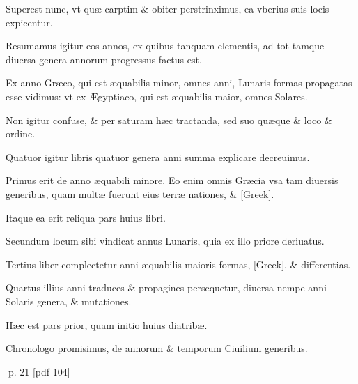 \begin{parnumbers}
Superest nunc, vt quæ carptim \& obiter perstrinximus, ea vberius suis locis expicentur.

Resumamus igitur eos annos, ex quibus tanquam elementis, ad tot tamque diuersa genera annorum progressus factus est.

Ex anno Græco, qui est æquabilis minor, omnes anni, Lunaris formas propagatas esse vidimus: vt ex Ægyptiaco, qui est æquabilis maior, omnes Solares.

Non igitur confuse, \& per saturam hæc tractanda, sed suo quæque \& loco \& ordine.

Quatuor igitur libris quatuor genera anni summa explicare decreuimus.

Primus erit de anno æquabili minore. Eo enim omnis Græcia vsa tam diuersis generibus, quam multæ fuerunt eius terræ nationes, \& \textgreek{[Greek]}.

Itaque ea erit reliqua pars huius libri.

Secundum locum sibi vindicat annus  Lunaris, quia ex illo priore deriuatus.

Tertius liber complectetur anni æquabilis maioris formas, \textgreek{[Greek]}, \& differentias.

Quartus illius anni traduces \& propagines persequetur, diuersa nempe anni Solaris genera, \& mutationes.

Hæc est pars prior, quam initio huius diatribæ.

Chronologo promisimus, de annorum \& temporum Ciuilium generibus.

\end{parnumbers}
\clearpage
p. 21 [pdf 104]

